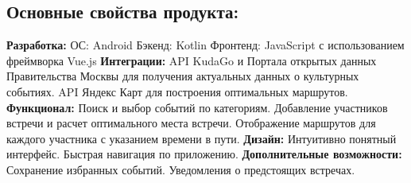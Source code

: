 \documentclass[a4paper,12pt]{extarticle}
\begin{document}
\subsection{Основные свойства продукта:}
\noindent
\textbf{Разработка:} 
\newline
ОС: Android
\newline
Бэкенд: Kotlin
\newline
Фронтенд: JavaScript с использованием фреймворка Vue.js
\newline
\textbf{Интеграции:}
\newline
API KudaGo и Портала открытых данных Правительства Москвы для получения актуальных данных о культурных 
событиях.
\newline
API Яндекс Карт для построения оптимальных маршрутов.
\newline
\textbf{Функционал:}
\newline
Поиск и выбор событий по категориям.
\newline
Добавление участников встречи и расчет оптимального места встречи.
\newline
Отображение маршрутов для каждого участника с указанием 
времени в пути.
\newline
\textbf{Дизайн:}
\newline
Интуитивно понятный интерфейс.
\newline
Быстрая навигация по приложению.
\newline
\textbf{Дополнительные возможности:}
\newline
Сохранение избранных событий.
\newline
Уведомления о предстоящих встречах.
\end{document}

